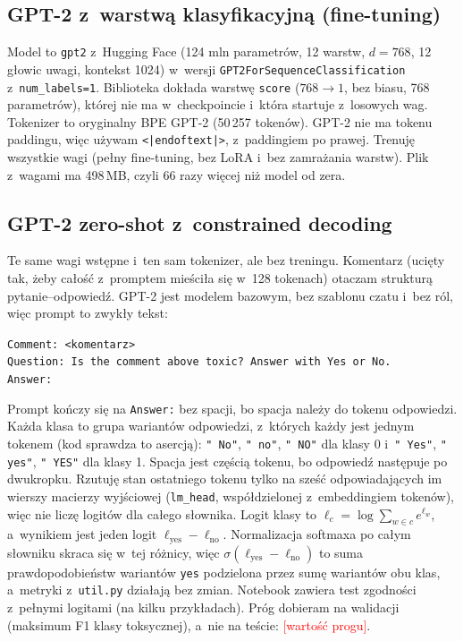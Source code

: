 \documentclass[10pt,a4paper]{article}
\newcommand{\todo}[1]{\textcolor{red}{[#1]}}
\begin{document}
\subsection{GPT-2 z~warstwą klasyfikacyjną (fine-tuning)}

Model to \texttt{gpt2} z~Hugging Face (124 mln parametrów, 12 warstw, $d=768$, 12 głowic uwagi, kontekst 1024) w~wersji \texttt{GPT2ForSequenceClassification} z~\texttt{num\_labels=1}. Biblioteka dokłada warstwę \texttt{score} ($768 \to 1$, bez biasu, 768 parametrów), której nie ma w~checkpoincie i~która startuje z~losowych wag. Tokenizer to oryginalny BPE GPT-2 (50\,257 tokenów). GPT-2 nie ma tokenu paddingu, więc używam \texttt{<|endoftext|>}, z~paddingiem po prawej. Trenuję wszystkie wagi (pełny fine-tuning, bez LoRA i~bez zamrażania warstw). Plik z~wagami ma 498\,MB, czyli 66 razy więcej niż model od zera.

\subsection{GPT-2 zero-shot z~constrained decoding}

Te same wagi wstępne i~ten sam tokenizer, ale bez treningu. Komentarz (ucięty tak, żeby całość z~promptem mieściła się w~128 tokenach) otaczam strukturą pytanie--odpowiedź. GPT-2 jest modelem bazowym, bez szablonu czatu i~bez ról, więc prompt to zwykły tekst:
\begin{center}
\texttt{Comment: <komentarz>}\\
\texttt{Question: Is the comment above toxic? Answer with Yes or No.}\\
\texttt{Answer:}
\end{center}
Prompt kończy się na \texttt{Answer:} bez spacji, bo spacja należy do tokenu odpowiedzi.
Każda klasa to grupa wariantów odpowiedzi, z~których każdy jest jednym tokenem (kod sprawdza to asercją): \texttt{" No"}, \texttt{" no"}, \texttt{" NO"} dla klasy 0 i~\texttt{" Yes"}, \texttt{" yes"}, \texttt{" YES"} dla klasy 1. Spacja jest częścią tokenu, bo odpowiedź następuje po dwukropku. Rzutuję stan ostatniego tokenu tylko na sześć odpowiadających im wierszy macierzy wyjściowej (\texttt{lm\_head}, współdzielonej z~embeddingiem tokenów), więc nie liczę logitów dla całego słownika. Logit klasy to $\ell_c = \log \sum_{w \in c} e^{\ell_w}$, a~wynikiem jest jeden logit $\ell_{\text{yes}} - \ell_{\text{no}}$. Normalizacja softmaxa po całym słowniku skraca się w~tej różnicy, więc $\sigma(\ell_{\text{yes}} - \ell_{\text{no}})$ to suma prawdopodobieństw wariantów \texttt{yes} podzielona przez sumę wariantów obu klas, a~metryki z~\texttt{util.py} działają bez zmian. Notebook zawiera test zgodności z~pełnymi logitami (na kilku przykładach). Próg dobieram na walidacji (maksimum F1 klasy toksycznej), a~nie na teście: \todo{wartość progu}.
\end{document}
